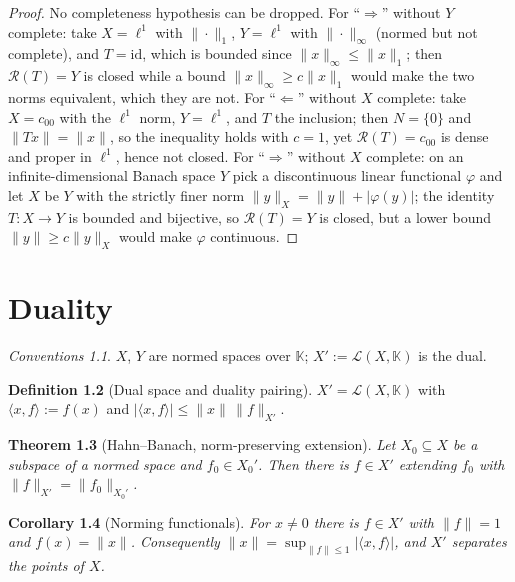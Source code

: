 \documentclass[a4paper]{report}
\theoremstyle{plain}
\newtheorem{theorem}{Theorem}[chapter]
\newtheorem{corollary}[theorem]{Corollary}
\theoremstyle{definition}
\newtheorem{definition}[theorem]{Definition}
\theoremstyle{remark}
\newtheorem{assumptions}[theorem]{Conventions}
\begin{document}
\begin{proof}
  No completeness hypothesis can be dropped.  For ``$\Rightarrow$'' without $Y$ complete:
  take $X = \ell^1$ with $\|\cdot\|_1$, $Y = \ell^1$ with $\|\cdot\|_\infty$ (normed but
  not complete), and $T = \mathrm{id}$, which is bounded since
  $\|x\|_\infty \le \|x\|_1$; then $\mathcal{R}(T) = Y$ is closed while a bound
  $\|x\|_\infty \ge c\|x\|_1$ would make the two norms equivalent, which they are not.
  For ``$\Leftarrow$'' without $X$ complete: take
  $X = c_{00}$ with the $\ell^1$ norm, $Y = \ell^1$, and $T$ the inclusion; then
  $N = \{0\}$ and $\|Tx\| = \|x\|$, so the inequality holds with $c = 1$, yet
  $\mathcal{R}(T) = c_{00}$ is dense and proper in $\ell^1$, hence not closed.  For
  ``$\Rightarrow$'' without $X$ complete: on an infinite-dimensional Banach space $Y$ pick
  a discontinuous linear functional $\varphi$ and let $X$ be $Y$ with the strictly finer
  norm $\|y\|_X = \|y\| + |\varphi(y)|$; the identity $T \colon X \to Y$ is bounded and
  bijective, so $\mathcal{R}(T) = Y$ is closed, but a lower bound $\|y\| \ge c\|y\|_X$
  would make $\varphi$ continuous.
\end{proof}


\chapter{Duality}
\label{ch_02_duality}

\begin{assumptions}
  \label{asm_duality}
  $X$, $Y$ are normed spaces over $\mathbb{K}$;
$X' := \mathcal{L}(X,\mathbb{K})$ is the dual.
\end{assumptions}



\begin{definition}[Dual space and duality pairing]
  \label{def_dual_space}
  $X' = \mathcal{L}(X,\mathbb{K})$ with $\langle x, f\rangle := f(x)$ and
  $|\langle x,f\rangle| \le \|x\|\,\|f\|_{X'}$.
\end{definition}


\begin{theorem}[Hahn--Banach, norm-preserving extension]
  \label{thm_hahn_banach}
  Let $X_0 \subseteq X$ be a subspace of a normed space and $f_0 \in X_0'$.  Then there is
  $f \in X'$ extending $f_0$ with $\|f\|_{X'} = \|f_0\|_{X_0'}$.
\end{theorem}


\begin{corollary}[Norming functionals]
  \label{cor_norming_functional}
  For $x \ne 0$ there is $f \in X'$ with $\|f\| = 1$ and $f(x) = \|x\|$.  Consequently
  $\|x\| = \sup_{\|f\|\le 1}|\langle x,f\rangle|$, and $X'$ separates the points of $X$.
\end{corollary}
\end{document}
